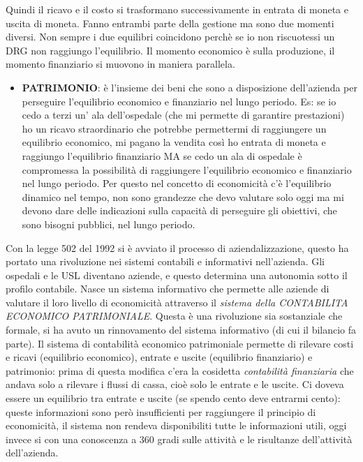 \documentclass[]{article}
\begin{document}
Quindi il ricavo e il costo si trasformano successivamente in entrata di
moneta e uscita di moneta. Fanno entrambi parte della gestione ma sono
due momenti diversi. Non sempre i due equilibri coincidono perchè se io
non riscuotessi un DRG non raggiungo l'equilibrio. Il momento economico
è sulla produzione, il momento finanziario si muovono in maniera
parallela.

\begin{itemize}
\item
  \textbf{PATRIMONIO}: è l'insieme dei beni che sono a disposizione
  dell'azienda per perseguire l'equilibrio economico e finanziario nel
  lungo periodo. Es: se io cedo a terzi un' ala dell'ospedale (che mi
  permette di garantire prestazioni) ho un ricavo straordinario che
  potrebbe permettermi di raggiungere un equilibrio economico, mi pagano
  la vendita così ho entrata di moneta e raggiungo l'equilibrio
  finanziario MA se cedo un ala di ospedale è compromessa la possibilità
  di raggiungere l'equilibrio economico e finanziario nel lungo periodo.
  Per questo nel concetto di economicità c'è l'equilibrio dinamico nel
  tempo, non sono grandezze che devo valutare solo oggi ma mi devono
  dare delle indicazioni sulla capacità di perseguire gli obiettivi, che
  sono bisogni pubblici, nel lungo periodo.
\end{itemize}

Con la legge 502 del 1992 si è avviato il processo di aziendalizzazione,
questo ha portato una rivoluzione nei sistemi contabili e informativi
nell'azienda. Gli ospedali e le USL diventano aziende, e questo
determina una autonomia sotto il profilo contabile. Nasce un sistema
informativo che permette alle aziende di valutare il loro livello di
economicità attraverso il \emph{sistema della CONTABILITA ECONOMICO
PATRIMONIALE}. Questa è una rivoluzione sia sostanziale che formale, si
ha avuto un rinnovamento del sistema informativo (di cui il bilancio fa
parte). Il sistema di contabilità economico patrimoniale permette di
rilevare costi e ricavi (equilibrio economico), entrate e uscite
(equilibrio finanziario) e patrimonio: prima di questa modifica c'era la
cosidetta \emph{contabilità finanziaria} che andava solo a rilevare i
flussi di cassa, cioè solo le entrate e le uscite. Ci doveva essere un
equilibrio tra entrate e uscite (se spendo cento deve entrarmi cento):
queste informazioni sono però insufficienti per raggiungere il principio
di economicità, il sistema non rendeva disponibiliti tutte le
informazioni utili, oggi invece si con una conoscenza a 360 gradi sulle
attività e le risultanze dell'attività dell'azienda.
\end{document}
